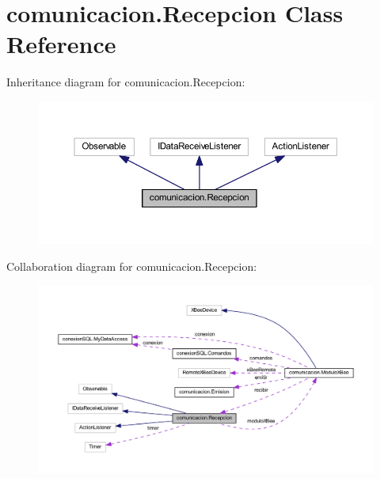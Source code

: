 \hypertarget{classcomunicacion_1_1_recepcion}{}\section{comunicacion.\+Recepcion Class Reference}
\label{classcomunicacion_1_1_recepcion}


Inheritance diagram for comunicacion.\+Recepcion\+:
\nopagebreak
\begin{figure}[H]
\begin{center}
\leavevmode
\includegraphics[width=350pt]{classcomunicacion_1_1_recepcion__inherit__graph}
\end{center}
\end{figure}


Collaboration diagram for comunicacion.\+Recepcion\+:
\nopagebreak
\begin{figure}[H]
\begin{center}
\leavevmode
\includegraphics[width=350pt]{classcomunicacion_1_1_recepcion__coll__graph}
\end{center}
\end{figure}
